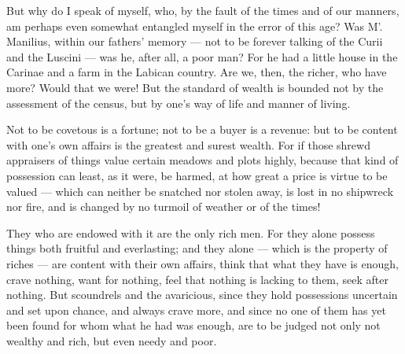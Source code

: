  But why do I speak of myself, who, by the fault of the times and of our manners, am perhaps even somewhat entangled myself in the error of this age? Was M'. Manilius, within our fathers' memory — not to be forever talking of the Curii and the Luscini — was he, after all, a poor man? For he had a little house in the Carinae and a farm in the Labican country. Are we, then, the richer, who have more? Would that we were! But the standard of wealth is bounded not by the assessment of the census, but by one's way of life and manner of living.

 Not to be covetous is a fortune; not to be a buyer is a revenue: but to be content with one's own affairs is the greatest and surest wealth. For if those shrewd appraisers of things value certain meadows and plots highly, because that kind of possession can least, as it were, be harmed, at how great a price is virtue to be valued — which can neither be snatched nor stolen away, is lost in no shipwreck nor fire, and is changed by no turmoil of weather or of the times!

 They who are endowed with it are the only rich men. For they alone possess things both fruitful and everlasting; and they alone — which is the property of riches — are content with their own affairs, think that what they have is enough, crave nothing, want for nothing, feel that nothing is lacking to them, seek after nothing. But scoundrels and the avaricious, since they hold possessions uncertain and set upon chance, and always crave more, and since no one of them has yet been found for whom what he had was enough, are to be judged not only not wealthy and rich, but even needy and poor.
